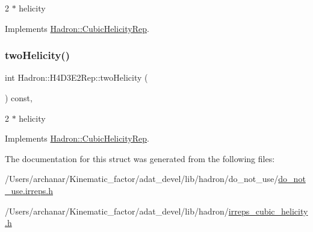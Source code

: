 2 $\ast$ helicity 

Implements \mbox{\hyperlink{structHadron_1_1CubicHelicityRep_af507aa56fc2747eacc8cb6c96db31ecc}{Hadron\+::\+Cubic\+Helicity\+Rep}}.

\mbox{\label{structHadron_1_1H4D3E2Rep_ad32976f01733eae853ca8ec5fa040b10}} 
\subsubsection{\texorpdfstring{twoHelicity()}{twoHelicity()}\hspace{0.1cm}{\footnotesize\ttfamily [2/2]}}
{\footnotesize\ttfamily int Hadron\+::\+H4\+D3\+E2\+Rep\+::two\+Helicity (\begin{DoxyParamCaption}{ }\end{DoxyParamCaption}) const\hspace{0.3cm}{\ttfamily [inline]}, {\ttfamily [virtual]}}

2 $\ast$ helicity 

Implements \mbox{\hyperlink{structHadron_1_1CubicHelicityRep_af507aa56fc2747eacc8cb6c96db31ecc}{Hadron\+::\+Cubic\+Helicity\+Rep}}.



The documentation for this struct was generated from the following files\+:\begin{DoxyCompactItemize}
\item 
/\+Users/archanar/\+Kinematic\+\_\+factor/adat\+\_\+devel/lib/hadron/do\+\_\+not\+\_\+use/\mbox{\hyperlink{do__not__use_8irreps_8h}{do\+\_\+not\+\_\+use.\+irreps.\+h}}\item 
/\+Users/archanar/\+Kinematic\+\_\+factor/adat\+\_\+devel/lib/hadron/\mbox{\hyperlink{lib_2hadron_2irreps__cubic__helicity_8h}{irreps\+\_\+cubic\+\_\+helicity.\+h}}\end{DoxyCompactItemize}

